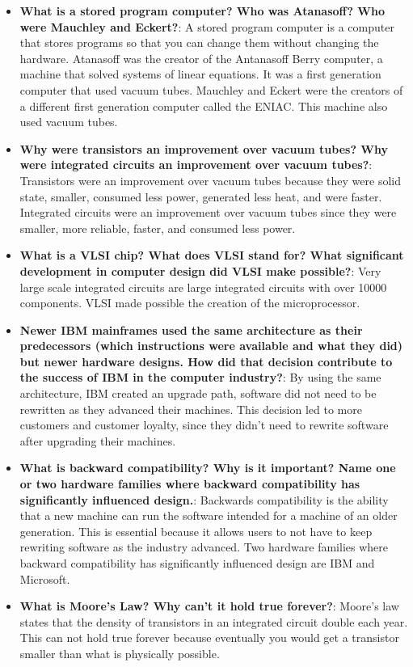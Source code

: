 \documentclass{report}
\begin{document}
    \begin{itemize}
        \item \textbf{What is a stored program computer? Who was Atanasoff? Who were Mauchley and Eckert?}: A stored program computer is a computer that stores programs so that you can change them without changing the hardware.
            \bigbreak \noindent 
            Atanasoff was the creator of the Antanasoff Berry computer, a machine that solved systems of linear equations. It was a first generation computer that used vacuum tubes.
            \bigbreak \noindent 
            Mauchley and Eckert were the creators of a different first generation computer called the ENIAC. This machine also used vacuum tubes.
        \item \textbf{Why were transistors an improvement over vacuum tubes? Why were integrated circuits an improvement over vacuum tubes?}:
            \bigbreak \noindent 
            Transistors were an improvement over vacuum tubes because they were solid state, smaller, consumed less power, generated less heat, and were faster.
            \bigbreak \noindent 
            Integrated circuits were an improvement over vacuum tubes since they were smaller, more reliable, faster, and consumed less power.
        \item \textbf{What is a VLSI chip? What does VLSI stand for? What significant development in computer design did VLSI make possible?}: Very large scale integrated circuits are large integrated circuits with over 10000 components.
            \bigbreak \noindent 
            VLSI made possible the creation of the microprocessor.
        \item \textbf{Newer IBM mainframes used the same architecture as their predecessors (which instructions were available and what they did) but newer hardware designs. How did that decision contribute to the success of IBM in the computer industry?}: By using the same architecture, IBM created an upgrade path, software did not need to be rewritten as they advanced their machines.
            \bigbreak \noindent 
            This decision led to more customers and customer loyalty, since they didn't need to rewrite software after upgrading their machines.
        \item \textbf{What is backward compatibility? Why is it important? Name one or two hardware families where backward compatibility has significantly influenced design.}: Backwards compatibility is the ability that a new machine can run the software intended for a machine of an older generation.
            \bigbreak \noindent 
            This is essential because it allows users to not have to keep rewriting software as the industry advanced.
            \bigbreak \noindent 
            Two hardware families where backward compatibility has significantly influenced design are IBM and Microsoft.
        \item \textbf{What is Moore’s Law? Why can’t it hold true forever?}: Moore's law states that the density of transistors in an integrated circuit double each year.
            \bigbreak \noindent 
            This can not hold true forever because eventually you would get a transistor smaller than what is physically possible.
    \end{itemize}
\end{document}
